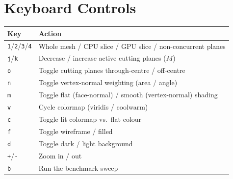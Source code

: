 \documentclass[10pt]{article}
\begin{document}
\section*{Keyboard Controls}
\begin{tabular}{@{}ll@{}}
\toprule
Key & Action \\
\midrule
\texttt{1}/\texttt{2}/\texttt{3}/\texttt{4} & Whole mesh / CPU slice / GPU slice / non-concurrent planes \\
\texttt{j}/\texttt{k} & Decrease / increase active cutting planes ($M$) \\
\texttt{o} & Toggle cutting planes through-centre / off-centre \\
\texttt{n} & Toggle vertex-normal weighting (area / angle) \\
\texttt{m} & Toggle flat (face-normal) / smooth (vertex-normal) shading \\
\texttt{v} & Cycle colormap (viridis / coolwarm) \\
\texttt{c} & Toggle lit colormap vs.\ flat colour \\
\texttt{f} & Toggle wireframe / filled \\
\texttt{d} & Toggle dark / light background \\
\texttt{+}/\texttt{-} & Zoom in / out \\
\texttt{b} & Run the benchmark sweep \\
\bottomrule
\end{tabular}
\end{document}
